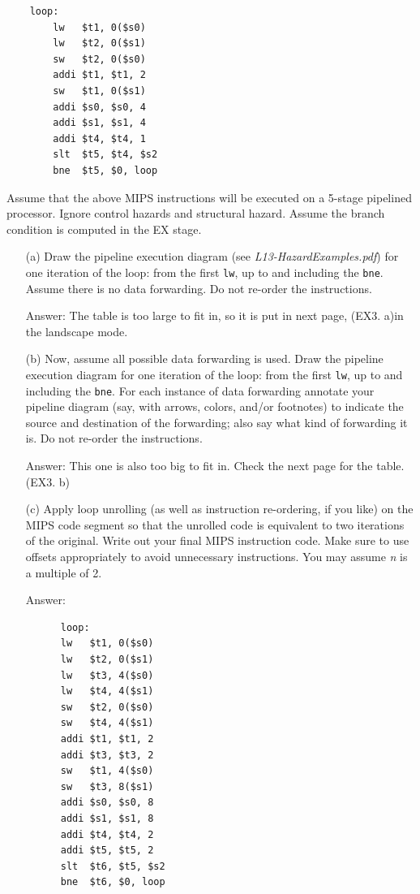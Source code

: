 \documentclass[12pt, a4paper]{article}
\begin{document}
\begin{verbatim}
    loop:
        lw   $t1, 0($s0)
        lw   $t2, 0($s1)
        sw   $t2, 0($s0)
        addi $t1, $t1, 2
        sw   $t1, 0($s1)
        addi $s0, $s0, 4
        addi $s1, $s1, 4
        addi $t4, $t4, 1
        slt  $t5, $t4, $s2
        bne  $t5, $0, loop
\end{verbatim}

Assume that the above MIPS instructions will be executed on a 5-stage pipelined processor. Ignore control hazards and structural hazard. Assume the branch condition is computed in the EX stage.

\begin{enumerate}
    \item [(a)]
    Draw the pipeline execution diagram (see \textit{L13-HazardExamples.pdf}) for one iteration of the loop: from the first \texttt{lw}, up to and including the \texttt{bne}. Assume there is no data forwarding. Do not re-order the instructions.

    Answer: The table is too large to fit in, so it is put in next page, (EX3. a)in the landscape mode.
  
    \item[(b)] 
    Now, assume all possible data forwarding is used. Draw the pipeline execution diagram for one iteration of the loop: from the first \texttt{lw}, up to and including the \texttt{bne}. For each instance of data forwarding annotate your pipeline diagram (say, with arrows, colors, and/or footnotes) to indicate the source and destination of the forwarding; also say what kind of forwarding it is. Do not re-order the instructions.

    Answer: This one is also too big to fit in. Check the next page for the table. (EX3. b)

    \item[(c)] 
    Apply loop unrolling (as well as instruction re-ordering, if you like) on the MIPS code segment so that the unrolled code is equivalent to two iterations of the original. Write out your final MIPS instruction code. Make sure to use offsets appropriately to avoid unnecessary instructions. You may assume \textit{n} is a multiple of 2.

    Answer:
    \begin{verbatim}
      loop:
      lw   $t1, 0($s0)
      lw   $t2, 0($s1)
      lw   $t3, 4($s0)
      lw   $t4, 4($s1)
      sw   $t2, 0($s0)
      sw   $t4, 4($s1)
      addi $t1, $t1, 2
      addi $t3, $t3, 2
      sw   $t1, 4($s0)
      sw   $t3, 8($s1)
      addi $s0, $s0, 8
      addi $s1, $s1, 8
      addi $t4, $t4, 2
      addi $t5, $t5, 2
      slt  $t6, $t5, $s2
      bne  $t6, $0, loop
    \end{verbatim}


\end{enumerate}
\end{document}
